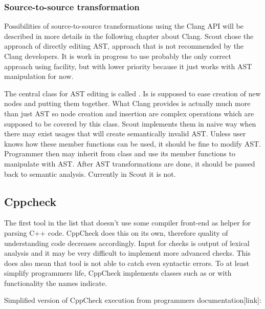 \subsubsection{Source-to-source transformation}
Possibilities of source-to-source transformations using the Clang API will be described in more details in the following chapter about Clang. Scout chose the approach of directly editing AST, approach that is not recommended by the Clang developers. It is work in progress to use probably the only correct approach using  facility, but with lower priority because it just works with AST manipulation for now.

The central class for AST editing is called . Is is supposed to ease creation of new nodes and putting them together. What Clang provides is actually much more than just AST so node creation and insertion are complex operations which are supposed to be covered by this class. Scout implements them in naive way when there may exist usages that will create semantically invalid AST. Unless user knows how these member functions can be used, it should be fine to modify AST. Programmer then may inherit from  class and use its member functions to manipulate with AST. After AST transformations are done, it should be passed back to semantic analysis. Currently in Scout it is not.

\subsection{Cppcheck}
The first tool in the list that doesn't use some compiler front-end as helper for parsing C++ code. CppCheck does this on its own, therefore quality of understanding code decreases accordingly. Input for checks is output of lexical analysis and it may be very difficult to implement more advanced checks. This does also mean that tool is not able to catch even syntactic errors. To at least simplify programmers life, CppCheck implements classes such as  or  with functionality the names indicate.

Simplified version of CppCheck execution from programmers documentation[link]:


